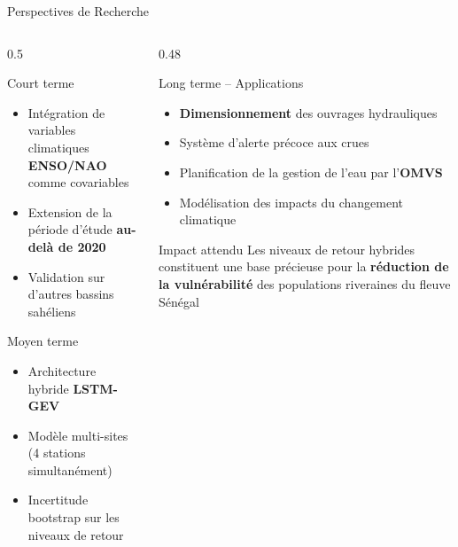 \documentclass[aspectratio=169, 9pt]{beamer}
\begin{document}
\begin{frame}{Perspectives de Recherche}
\begin{columns}[T]
\begin{column}{0.5\textwidth}
  \begin{block}{Court terme}
    \begin{itemize}
      \item Intégration de variables
            climatiques \textbf{ENSO/NAO}
            comme covariables
      \item Extension de la période
            d'étude \textbf{au-delà de 2020}
      \item Validation sur d'autres
            bassins sahéliens
    \end{itemize}
  \end{block}
  \vspace{0.2cm}
  \begin{block}{Moyen terme}
    \begin{itemize}
      \item Architecture hybride
            \textbf{LSTM-GEV}
      \item Modèle multi-sites
            (4 stations simultanément)
      \item Incertitude bootstrap
            sur les niveaux de retour
    \end{itemize}
  \end{block}
\end{column}
\begin{column}{0.48\textwidth}
  \begin{block}{Long terme -- Applications}
    \begin{itemize}
      \item \textbf{Dimensionnement} des
            ouvrages hydrauliques
      \item Système d'alerte précoce
            aux crues
      \item Planification de la gestion
            de l'eau par l'\textbf{OMVS}
      \item Modélisation des impacts
            du changement climatique
    \end{itemize}
  \end{block}
  \vspace{0.1cm}
  \begin{alertblock}{Impact attendu}
  \small
    Les niveaux de retour hybrides
    constituent une base précieuse
    pour la \textbf{réduction de la
    vulnérabilité} des populations
    riveraines du fleuve Sénégal
  \end{alertblock}
\end{column}
\end{columns}
\end{frame}
\end{document}
